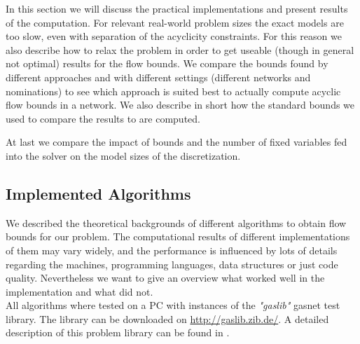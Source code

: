 In this section we will discuss the practical implementations and present results of the computation. For relevant 
real-world problem sizes the exact models are too slow, even with separation of the acyclicity constraints. For this 
reason we also describe how to relax the problem in order to get useable (though in general not optimal) results for the 
flow bounds. 
We compare the bounds found by different approaches and with different settings (different networks and nominations) 
to see which approach is suited best to actually compute acyclic flow bounds in a network. We also describe in short 
how the standard bounds we used to compare the results to are computed. 

At last we compare the impact of bounds and the number of fixed variables fed into the solver on the model sizes of the 
discretization. \\

\subsection{Implemented Algorithms}

We described the theoretical backgrounds of different algorithms to obtain flow bounds for our problem. The 
computational results of different implementations of them may vary widely, and the performance is influenced by lots 
of details regarding the machines, programming languages, data structures or just code quality. Nevertheless we want 
to give an overview what worked well in the implementation and what did not.\\

All algorithms where tested on a PC with instances of the \textit{"gaslib"} gasnet test library. The library can be 
downloaded on \url{http://gaslib.zib.de/}. A detailed description of this problem library can be found in 
\cite{HumpolaJoormannOucherifPfetschScheweSchmidtSchwarz:2015}.

